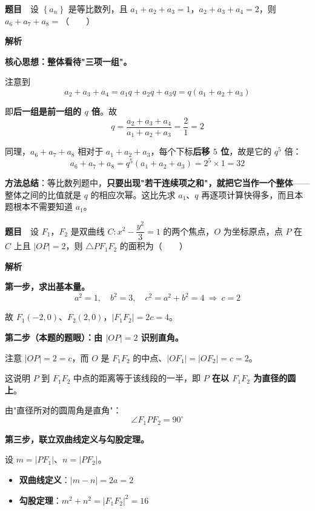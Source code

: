 \par\medskip


\textbf{题目}　设 $\left\{a_n\right\}$ 是等比数列，且 $a_1+a_2+a_3=1$，$a_2+a_3+a_4=2$，则 $a_6+a_7+a_8=$（　　）

\textbf{解析}

\textbf{核心思想：整体看待"三项一组"。}

注意到
\[a_2+a_3+a_4=a_1q+a_2q+a_3q=q\left(a_1+a_2+a_3\right)\]

即\textbf{后一组是前一组的 $q$ 倍}。故
\[q=\frac{a_2+a_3+a_4}{a_1+a_2+a_3}=\frac21=2\]

同理，$a_6+a_7+a_8$ 相对于 $a_1+a_2+a_3$，每个下标\textbf{后移 $5$ 位}，故是它的 $q^{5}$ 倍：
\[a_6+a_7+a_8=q^{5}\left(a_1+a_2+a_3\right)=2^{5}\times1=32\]


\begin{gktip}
\textbf{方法总结}：等比数列题中，\textbf{只要出现"若干连续项之和"，就把它当作一个整体}——整体之间的比值就是 $q$ 的相应次幂。这比先求 $a_1$、$q$ 再逐项计算快得多，而且本题根本不需要知道 $a_1$。
\end{gktip}

\par\medskip


\textbf{题目}　设 $F_1$，$F_2$ 是双曲线 $C:x^{2}-\dfrac{y^{2}}3=1$ 的两个焦点，$O$ 为坐标原点，点 $P$ 在 $C$ 上且 $|OP|=2$，则 $\triangle PF_1F_2$ 的面积为（　　）

\textbf{解析}

\textbf{第一步，求出基本量。}
\[a^{2}=1,\quad b^{2}=3,\quad c^{2}=a^{2}+b^{2}=4\ \Longrightarrow\ c=2\]

故 $F_1(-2,0)$、$F_2(2,0)$，$\left|F_1F_2\right|=2c=4$。

\textbf{第二步（本题的题眼）：由 $|OP|=2$ 识别直角。}

注意 $|OP|=2=c$，而 $O$ 是 $F_1F_2$ 的中点、$\left|OF_1\right|=\left|OF_2\right|=c=2$。

这说明 $P$ 到 $F_1F_2$ 中点的距离等于该线段的一半，即 \textbf{$P$ 在以 $F_1F_2$ 为直径的圆上}。

由"直径所对的圆周角是直角"：
\[\angle F_1PF_2=90^\circ\]

\textbf{第三步，联立双曲线定义与勾股定理。}

设 $m=\left|PF_1\right|$、$n=\left|PF_2\right|$。

\begin{itemize}
\item \textbf{双曲线定义}：$|m-n|=2a=2$
\item \textbf{勾股定理}：$m^{2}+n^{2}=\left|F_1F_2\right|^{2}=16$
\end{itemize}

